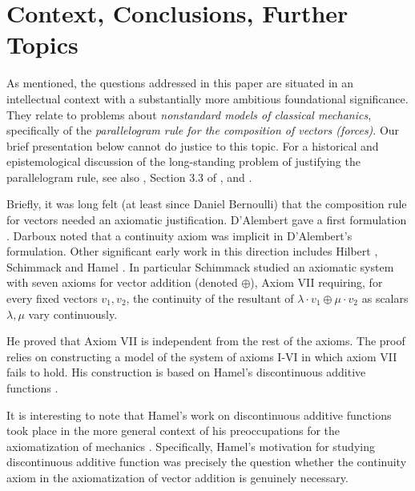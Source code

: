 \documentclass[11pt]{amsart} %
\theoremstyle{definition}
\begin{document}
\section{Context, Conclusions, Further Topics}
\label{sec:8}

As mentioned, the questions addressed in this paper 
are situated in an intellectual context with a substantially more 
ambitious foundational significance. They relate to problems about \emph{nonstandard models of classical mechanics}, specifically of the \emph{parallelogram rule for the composition of vectors (forces)}. Our brief presentation below cannot do justice to this topic. For a historical and epistemological discussion of the long-standing problem
of justifying the parallelogram rule, see also 
\cite{46}, Section 3.3 of \cite{31}, and \cite{32,33}. 

Briefly, it was long felt (at least since Daniel Bernoulli) that the composition rule for vectors needed an axiomatic justification. D'Alembert gave a first formulation \cite{27}. Darboux \cite{28} noted that a continuity axiom was implicit in D'Alembert's formulation. Other significant early work in this direction includes Hilbert \cite{37}, Schimmack \cite{29,30} and Hamel \cite{36}. In particular Schimmack studied an axiomatic system with seven axioms for vector addition (denoted $\oplus$), Axiom VII requiring, for every fixed vectors $v_1,v_2$, the continuity of the resultant of $\lambda \cdot v_1 \oplus \mu \cdot v_2$ as scalars $\lambda,\mu$ vary continuously. 

He proved that Axiom VII is independent from the rest of the axioms. The proof relies on constructing a model of the system of axioms I-VI  in which axiom VII fails to hold. His construction is based on Hamel's discontinuous additive functions \cite{35}. 

It is interesting to note that Hamel's work on discontinuous additive functions \cite{35} took place in the more general context of his preoccupations for the axiomatization of mechanics \cite{34}. Specifically, Hamel's motivation for studying discontinuous additive function was precisely the question whether the continuity axiom in the axiomatization of vector addition is genuinely necessary.
\end{document}
